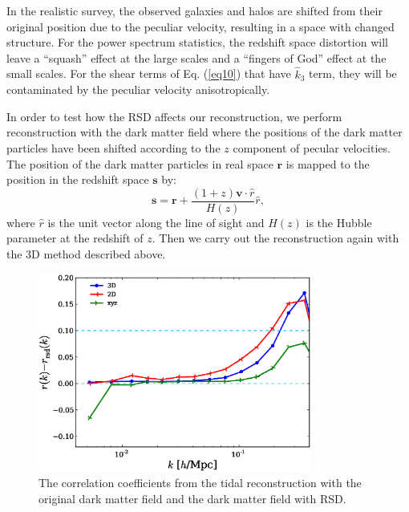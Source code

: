 \documentclass[aps,prd,twocolumn,showpacs,superscriptaddress,groupedaddress,nofootinbib]{revtex4}  %
\begin{document}


In the realistic survey, the observed galaxies and halos are shifted from their original position due to the peculiar velocity, resulting in a space with changed structure. For the power spectrum statistics, the redshift space distortion will leave a ``squash'' effect \cite{1987MNRAS.227....1K} at the large scales and a ``fingers of God'' effect \cite{1972MNRAS.156P...1J} at the small scales. For the shear terms of Eq. (\ref{eq10}) that have $\hat{k}_{3}$ term, they will be contaminated by the peculiar velocity anisotropically. 

In order to test how the RSD affects our reconstruction, we perform reconstruction with the dark matter field where the positions of the dark matter particles have been shifted according to the $z$ component of pecular velocities. The position of the dark matter particles in real space $\bm{r}$ is mapped to the position in the redshift space $\bm{s}$ by:
\begin{equation}
\bm{s} = \bm{r} + \frac{(1+z)\bm{v}\cdot\hat{r}}{H(z)}\hat{r},
\label{eq24}
\end{equation}
where $\hat{r}$ is the unit vector along the line of sight and $H(z)$ is the Hubble parameter at the redshift of $z$. Then we carry out the reconstruction again with the 3D method described above. 

\begin{figure}[h!]
      \centering
      \includegraphics[width=9cm]{1D_correlation_no_rsd_delta.eps}
      \caption{The correlation coefficients from the tidal reconstruction with the original dark matter field and the dark matter field with RSD.}
      \label{1D_correlation_no_rsd}
\end{figure}
\end{document}
